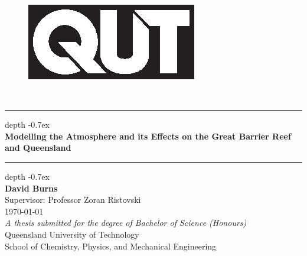 
\begin{titlepage}
	\begin{center}
		\begin{figure}[h]
	 	    \centering
	 	    \includegraphics[scale=1.5]{Fig/QUT_Square_Black.eps}
	 	\end{figure}
	 	~\\
		\leavevmode\leaders\hrule height 0.7ex depth -0.7ex\hfill\kern0pt\\
		\LARGE
		\textbf{Modelling the Atmosphere and its Effects on the Great Barrier Reef and Queensland} \\
		\leavevmode\leaders\hrule height 0.7ex depth -0.7ex\hfill\kern0pt\\
		\vfill
		\textbf{David Burns}\\
		Supervisor: Professor Zoran Ristovski\\
		\vfill
		\printdayoff
		\today
		\\
		\vfill
		\large
		\textit{A thesis submitted for the degree of Bachelor of Science (Honours)}\\
		Queensland University of Technology\\
		School of Chemistry, Physics, and Mechanical Engineering

	\end{center}
\end{titlepage}